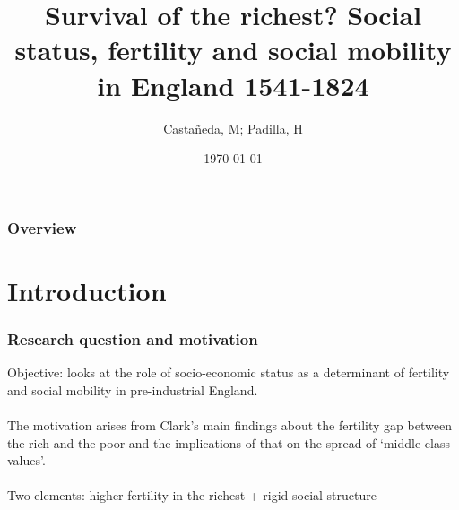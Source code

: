 \documentclass[pdftex,12pt,xcolor=pdftex,table]{beamer}
\title[Survival of the richest?]{Survival of the richest? Social status, fertility and social mobility in England 1541-1824} %
\author{Castañeda, M; Padilla, H} %
\institute[PUJ - UA] %
{
Summer School of Economics: Economic Growth and Comparative Development \\ %
\medskip
}
\date{\today} %
\begin{document}
\begin{frame}
\titlepage %
\end{frame}

\begin{frame}
\frametitle{Overview} %
\tableofcontents %
\end{frame}


\section{Introduction} %


\begin{frame}
\frametitle{Research question and motivation}
 Objective: looks at the role of socio-economic status as a determinant of fertility and social mobility in pre-industrial England.\\~\\

The motivation arises from Clark's main findings about the fertility gap between the rich and the poor and the implications of that on the spread of ‘middle-class values’.\\~\\

Two elements: higher fertility in the richest + rigid social structure  
\end{frame}
\end{document}
